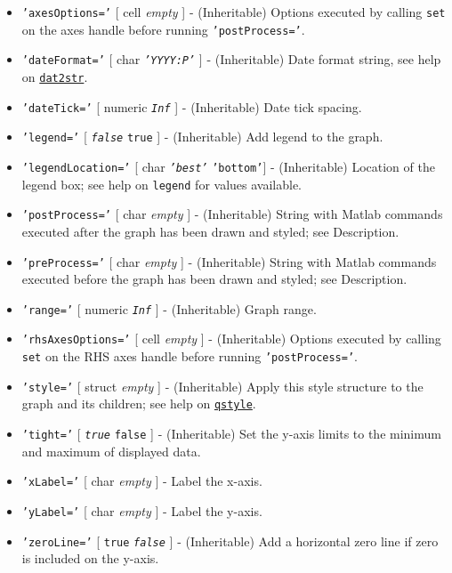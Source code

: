 \begin{itemize}
\item
  \texttt{'axesOptions='} {[} cell \textbar{} \emph{empty} {]} -
  (Inheritable) Options executed by calling \texttt{set} on the axes
  handle before running \texttt{'postProcess='}.
\item
  \texttt{'dateFormat='} {[} char \textbar{} \emph{\texttt{'YYYY:P'}}
  {]} - (Inheritable) Date format string, see help on
  \href{dates/dat2str}{\texttt{dat2str}}.
\item
  \texttt{'dateTick='} {[} numeric \textbar{} \emph{\texttt{Inf}} {]} -
  (Inheritable) Date tick spacing.
\item
  \texttt{'legend='} {[} \emph{\texttt{false}} \textbar{} \texttt{true}
  {]} - (Inheritable) Add legend to the graph.
\item
  \texttt{'legendLocation='} {[} char \textbar{} \emph{\texttt{'best'}}
  \textbar{} \texttt{'bottom'}{]} - (Inheritable) Location of the legend
  box; see help on \texttt{legend} for values available.
\item
  \texttt{'postProcess='} {[} char \textbar{} \emph{empty} {]} -
  (Inheritable) String with Matlab commands executed after the graph has
  been drawn and styled; see Description.
\item
  \texttt{'preProcess='} {[} char \textbar{} \emph{empty} {]} -
  (Inheritable) String with Matlab commands executed before the graph
  has been drawn and styled; see Description.
\item
  \texttt{'range='} {[} numeric \textbar{} \emph{\texttt{Inf}} {]} -
  (Inheritable) Graph range.
\item
  \texttt{'rhsAxesOptions='} {[} cell \textbar{} \emph{empty} {]} -
  (Inheritable) Options executed by calling \texttt{set} on the RHS axes
  handle before running \texttt{'postProcess='}.
\item
  \texttt{'style='} {[} struct \textbar{} \emph{empty} {]} -
  (Inheritable) Apply this style structure to the graph and its
  children; see help on \href{qreport/qstyle}{\texttt{qstyle}}.
\item
  \texttt{'tight='} {[} \emph{\texttt{true}} \textbar{} \texttt{false}
  {]} - (Inheritable) Set the y-axis limits to the minimum and maximum
  of displayed data.
\item
  \texttt{'xLabel='} {[} char \textbar{} \emph{empty} {]} - Label the
  x-axis.
\item
  \texttt{'yLabel='} {[} char \textbar{} \emph{empty} {]} - Label the
  y-axis.
\item
  \texttt{'zeroLine='} {[} \texttt{true} \textbar{}
  \emph{\texttt{false}} {]} - (Inheritable) Add a horizontal zero line
  if zero is included on the y-axis.
\end{itemize}

